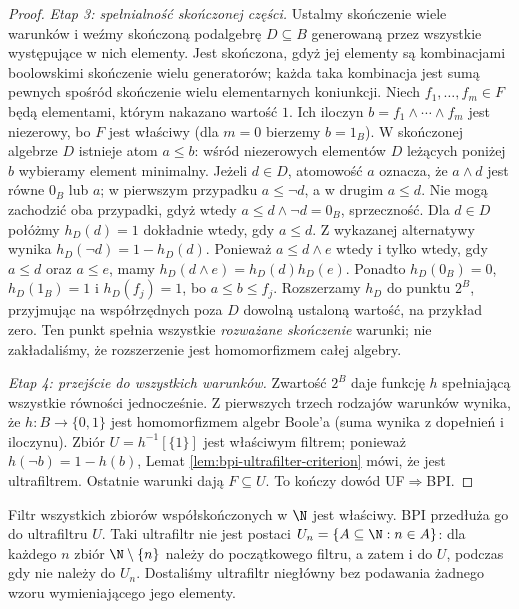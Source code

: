 \begin{proof}
\emph{Etap 3: spełnialność skończonej części.}
Ustalmy skończenie wiele warunków i weźmy skończoną
podalgebrę $D\subseteq B$ generowaną przez wszystkie
występujące w nich elementy. Jest skończona, gdyż jej
elementy są kombinacjami boolowskimi skończenie wielu
generatorów; każda taka kombinacja jest sumą pewnych
spośród skończenie wielu elementarnych koniunkcji.
Niech $f_1,\dots,f_m\in F$ będą elementami,
którym nakazano wartość $1$. Ich iloczyn
$b=f_1\wedge\cdots\wedge f_m$ jest niezerowy,
bo $F$ jest właściwy (dla $m=0$ bierzemy $b=1_B$).
W skończonej algebrze $D$ istnieje atom $a\leq b$:
wśród niezerowych elementów $D$ leżących poniżej $b$
wybieramy element minimalny.
Jeżeli $d\in D$, atomowość $a$ oznacza,
że $a\wedge d$ jest równe $0_B$ lub $a$;
w pierwszym przypadku $a\le\neg d$,
a w drugim $a\le d$.
Nie mogą zachodzić oba przypadki, gdyż wtedy
$a\le d\wedge\neg d=0_B$, sprzeczność.
Dla $d\in D$ połóżmy
$h_D(d)=1$ dokładnie wtedy, gdy $a\leq d$.
Z wykazanej alternatywy wynika
$h_D(\neg d)=1-h_D(d)$.
Ponieważ $a\le d\wedge e$
wtedy i tylko wtedy, gdy
$a\le d$ oraz $a\le e$, mamy
$h_D(d\wedge e)=h_D(d)h_D(e)$.
Ponadto $h_D(0_B)=0$, $h_D(1_B)=1$
i $h_D(f_j)=1$, bo $a\le b\le f_j$. Rozszerzamy $h_D$
do punktu $2^B$, przyjmując na współrzędnych poza $D$
dowolną ustaloną wartość, na przykład zero.
Ten punkt spełnia wszystkie \emph{rozważane skończenie}
warunki; nie zakładaliśmy, że rozszerzenie jest
homomorfizmem całej algebry.

\emph{Etap 4: przejście do wszystkich warunków.}
Zwartość $2^B$ daje funkcję $h$ spełniającą wszystkie
równości jednocześnie. Z pierwszych trzech rodzajów
warunków wynika, że $h:B\to\{0,1\}$ jest homomorfizmem
algebr Boole'a (suma wynika z dopełnień i iloczynu).
Zbiór $U=h^{-1}[\{1\}]$ jest właściwym filtrem;
ponieważ $h(\neg b)=1-h(b)$, Lemat
\ref{lem:bpi-ultrafilter-criterion} mówi, że jest
ultrafiltrem. Ostatnie warunki dają $F\subseteq U$.
To kończy dowód UF$\Rightarrow$BPI.
\end{proof}

\begin{przyklad}
\label{ex:bpi-free-ultrafilter}
Filtr wszystkich zbiorów współskończonych w $\N$
jest właściwy. BPI przedłuża go do ultrafiltru $U$.
Taki ultrafiltr nie jest postaci
$U_n=\{A\subseteq\N:n\in A\}$: dla każdego $n$
zbiór $\N\setminus\{n\}$ należy do początkowego filtru,
a zatem i do $U$, podczas gdy nie należy do $U_n$.
Dostaliśmy ultrafiltr niegłówny bez podawania
żadnego wzoru wymieniającego jego elementy.
\end{przyklad}


